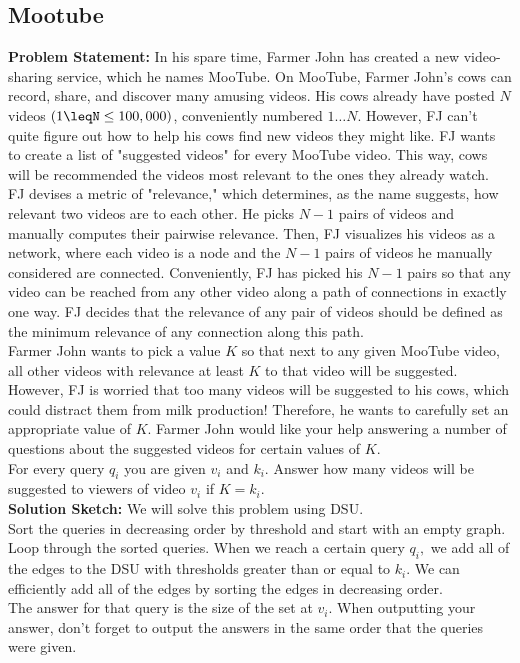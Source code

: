 \documentclass{article}
\begin{document}
\subsection{Mootube}
\textbf{Problem Statement:} In his spare time, Farmer John has created a new video-sharing service, which he names MooTube. On MooTube, Farmer John's cows can record, share, and discover many amusing videos. His cows already have posted $N$ videos $(1\leqN\leq100,000)$, conveniently numbered $1…N$. However, FJ can't quite figure out how to help his cows find new videos they might like.
FJ wants to create a list of "suggested videos" for every MooTube video. This way, cows will be recommended the videos most relevant to the ones they already watch.
\\
FJ devises a metric of "relevance," which determines, as the name suggests, how relevant two videos are to each other. He picks $N−1$ pairs of videos and manually computes their pairwise relevance. Then, FJ visualizes his videos as a network, where each video is a node and the $N−1$ pairs of videos he manually considered are connected. Conveniently, FJ has picked his $N−1$ pairs so that any video can be reached from any other video along a path of connections in exactly one way. FJ decides that the relevance of any pair of videos should be defined as the minimum relevance of any connection along this path.
\\
Farmer John wants to pick a value $K$ so that next to any given MooTube video, all other videos with relevance at least $K$ to that video will be suggested. However, FJ is worried that too many videos will be suggested to his cows, which could distract them from milk production! Therefore, he wants to carefully set an appropriate value of $K$. Farmer John would like your help answering a number of questions about the suggested videos for certain values of $K$.
\\
For every query $q_i$ you are given $v_i$ and $k_i.$ Answer how many videos will be suggested to viewers of video $v_i$ if  $K=k_i.$
\\
\textbf{Solution Sketch:}
We will solve this problem using DSU.
\\
Sort the queries in decreasing order by threshold and start with an empty graph. Loop through the sorted queries. When we reach a certain query $q_i,$ we add all of the edges to the DSU with thresholds greater than or equal to $k_i.$ We can efficiently add all of the edges by sorting the edges in decreasing order.
\\
The answer for that query is the size of the set at $v_i.$ When outputting your answer, don't forget to output the answers in the same order that the queries were given.
\end{document}
